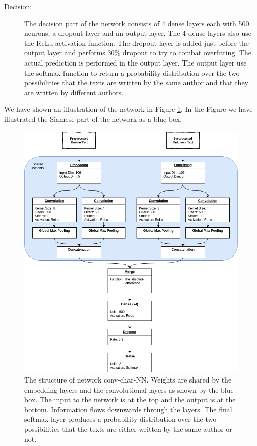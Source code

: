\begin{description}
    \item[Decision:]

        The decision part of the network consists of 4 dense layers each with
        500 neurons, a dropout layer and an output layer. The 4 dense layers
        also use the \gls{ReLu} activation function. The dropout layer is added
        just before the output layer and performs 30\% dropout to try to combat
        overfitting. The actual prediction is performed in the output layer. The
        output layer use the softmax function to return a probability
        distribution over the two possibilities that the texts are written by
        the same author and that they are written by different authors.

\end{description}

We have shown an illustration of the network in Figure \ref{fig:conv-char-NN}.
In the Figure we have illustrated the Siamese part of the network as a blue box.

\begin{figure}
    \centering
    \includegraphics[width=\textwidth]{./pictures/experiments/network3.png}
    \caption{The structure of network \gls{conv-char-NN}. Weights are
        shared by the embedding layers and the convolutional layers as shown by
        the blue box. The input to the network is at the top and the output is
        at the bottom. Information flows downwards through the layers. The final
        softmax layer produces a probability distribution over the two
        possibilities that the texts are either written by the same author or
        not.}
    \label{fig:conv-char-NN}
\end{figure}

